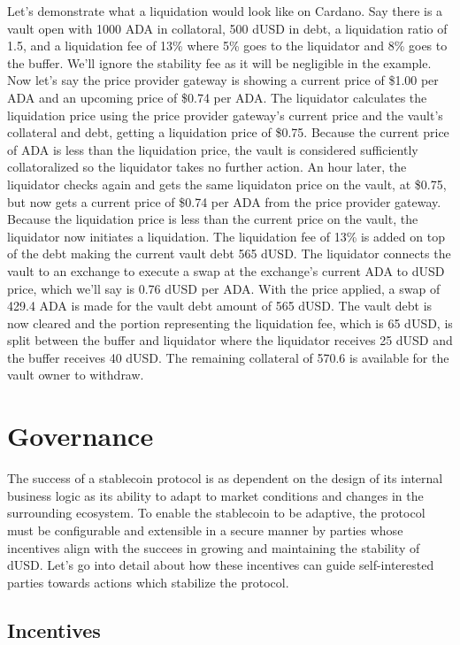 \documentclass[12pt]{article}
\begin{document}
Let's demonstrate what a liquidation would look like on Cardano. Say there is a vault open with 1000 ADA in collatoral, 500 dUSD in debt, a liquidation ratio of 1.5, and a liquidation fee of 13\% where 5\% goes to the liquidator and 8\% goes to the buffer. We'll ignore the stability fee as it will be negligible in the example. Now let's say the price provider gateway is showing a current price of \$1.00 per ADA and an upcoming price of \$0.74 per ADA. The liquidator calculates the liquidation price using the price provider gateway's current price and the vault's collateral and debt, getting a liquidation price of \$0.75. Because the current price of ADA is less than the liquidation price, the vault is considered sufficiently collatoralized so the liquidator takes no further action. An hour later, the liquidator checks again and gets the same liquidaton price on the vault, at \$0.75, but now gets a current price of \$0.74 per ADA from the price provider gateway. Because the liquidation price is less than the current price on the vault, the liquidator now initiates a liquidation. The liquidation fee of 13\% is added on top of the debt making the current vault debt 565 dUSD. The liquidator connects the vault to an exchange to execute a swap at the exchange's current ADA to dUSD price, which we'll say is 0.76 dUSD per ADA. With the price applied, a swap of 429.4 ADA is made for the vault debt amount of 565 dUSD. The vault debt is now cleared and the portion representing the liquidation fee, which is 65 dUSD, is split between the buffer and liquidator where the liquidator receives 25 dUSD and the buffer receives 40 dUSD. The remaining collateral of 570.6 is available for the vault owner to withdraw.

\section{Governance}

The success of a stablecoin protocol is as dependent on the design of its internal business logic as its ability to adapt to market conditions and changes in the surrounding ecosystem. To enable the stablecoin to be adaptive, the protocol must be configurable and extensible in a secure manner by parties whose incentives align with the succees in growing and maintaining the stability of dUSD. Let's go into detail about how these incentives can guide self-interested parties towards actions which stabilize the protocol.

\subsection{Incentives}
\end{document}
